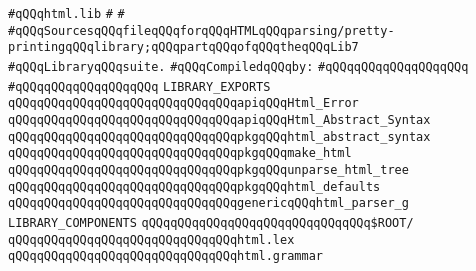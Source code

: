 \label{src/lib/html/html.lib}
\verb|#qQQqhtml.lib|\newline
\verb|#|\newline
\verb|#|\newline
\verb|#qQQqSourcesqQQqfileqQQqforqQQqHTMLqQQqparsing/pretty-printingqQQqlibrary;qQQqpartqQQqofqQQqtheqQQqLib7|\newline
\verb|#qQQqLibraryqQQqsuite.|\newline
\newline
\verb|#qQQqCompiledqQQqby:|\newline
\verb|#qQQqqQQqqQQqqQQqqQQq|\newline
\verb|#qQQqqQQqqQQqqQQqqQQq|\newline
\newline
\verb|LIBRARY_EXPORTS|\newline
\newline
\verb|qQQqqQQqqQQqqQQqqQQqqQQqqQQqqQQqapiqQQqHtml_Error|\newline
\newline
\verb|qQQqqQQqqQQqqQQqqQQqqQQqqQQqqQQqapiqQQqHtml_Abstract_Syntax|\newline
\verb|qQQqqQQqqQQqqQQqqQQqqQQqqQQqqQQqpkgqQQqhtml_abstract_syntax|\newline
\newline
\verb|qQQqqQQqqQQqqQQqqQQqqQQqqQQqqQQqpkgqQQqmake_html|\newline
\verb|qQQqqQQqqQQqqQQqqQQqqQQqqQQqqQQqpkgqQQqunparse_html_tree|\newline
\verb|qQQqqQQqqQQqqQQqqQQqqQQqqQQqqQQqpkgqQQqhtml_defaults|\newline
\verb|qQQqqQQqqQQqqQQqqQQqqQQqqQQqqQQqgenericqQQqhtml_parser_g|\newline
\newline
\newline
\newline
\verb|LIBRARY_COMPONENTS|\newline
\newline
\verb|qQQqqQQqqQQqqQQqqQQqqQQqqQQqqQQq$ROOT/|\newline
\newline
\verb|qQQqqQQqqQQqqQQqqQQqqQQqqQQqqQQqhtml.lex|\newline
\verb|qQQqqQQqqQQqqQQqqQQqqQQqqQQqqQQqhtml.grammar|\newline
